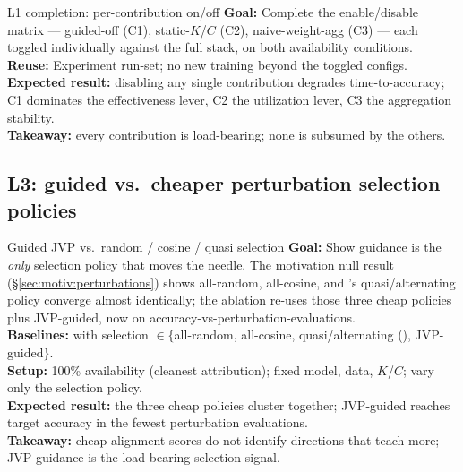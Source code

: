 \begin{plannedexp}{L1 completion: per-contribution on/off}
  \textbf{Goal:} Complete the enable/disable matrix --- guided-off
  (C1), static-$K$/$C$ (C2), naive-weight-agg (C3) --- each toggled
  individually against the full stack, on both availability
  conditions.\\[3pt]
  \textbf{Reuse:} Experiment run-set; no new training beyond the
  toggled configs.\\[3pt]
  \textbf{Expected result:} disabling any single contribution degrades
  time-to-accuracy; C1 dominates the effectiveness lever, C2 the
  utilization lever, C3 the aggregation stability.\\[3pt]
  \textbf{Takeaway:} every contribution is load-bearing; none is
  subsumed by the others.
\end{plannedexp}

\subsection{L3: guided vs.\ cheaper perturbation selection policies}
\label{sec:ablation:c1alt}

\begin{plannedexp}{Guided JVP vs.\ random / cosine / quasi selection}
  \textbf{Goal:} Show guidance is the \emph{only} selection policy
  that moves the needle. The motivation null result
  (\S\ref{sec:motiv:perturbations}) shows all-random, all-cosine, and
  \fwdllm{}'s quasi/alternating policy converge almost identically;
  the ablation re-uses those three cheap policies plus JVP-guided, now
  on accuracy-vs-perturbation-evaluations.\\[3pt]
  \textbf{Baselines:} \sys{} with selection $\in \{$all-random,
  all-cosine, quasi/alternating (\fwdllm{}), JVP-guided$\}$.\\[3pt]
  \textbf{Setup:} 100\% availability (cleanest attribution); fixed
  model, data, $K$/$C$; vary only the selection policy.\\[3pt]
  \textbf{Expected result:} the three cheap policies cluster together;
  JVP-guided reaches target accuracy in the fewest perturbation
  evaluations.\\[3pt]
  \textbf{Takeaway:} cheap alignment scores do not identify directions
  that teach more; JVP guidance is the load-bearing selection signal.
\end{plannedexp}

